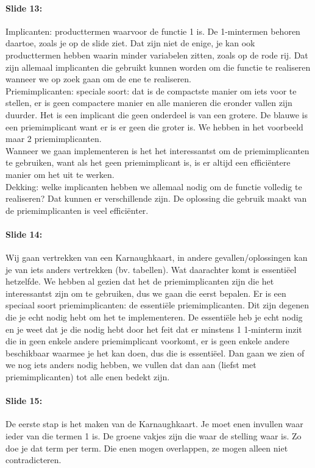 \documentclass[10pt,a4paper]{book}
\begin{document}
\paragraph{Slide 13:} Implicanten: producttermen waarvoor de functie 1 is. De 1-mintermen behoren daartoe, zoals je op de slide ziet. Dat zijn niet de enige, je kan ook producttermen hebben waarin minder variabelen zitten, zoals op de rode rij. Dat zijn allemaal implicanten die gebruikt kunnen worden om die functie te realiseren wanneer we op zoek gaan om de ene te realiseren.\\
Priemimplicanten: speciale soort: dat is de compactste manier om iets voor te stellen, er is geen compactere manier en alle manieren die eronder vallen zijn duurder. Het is een implicant die geen onderdeel is van een grotere. De blauwe is een priemimplicant want er is er geen die groter is. We hebben in het voorbeeld maar 2 priemimplicanten. \\
Wanneer we gaan implementeren is het het interessantst om de priemimplicanten te gebruiken, want als het geen priemimplicant is, is er altijd een effici\"entere manier om het uit te werken.\\
Dekking: welke implicanten hebben we allemaal nodig om de functie volledig te realiseren? Dat kunnen er verschillende zijn. De oplossing die gebruik maakt van de priemimplicanten is veel effici\"enter.

\paragraph{Slide 14:} Wij gaan vertrekken van een Karnaughkaart, in andere gevallen/oplossingen kan je van iets anders vertrekken (bv. tabellen). Wat daarachter komt is essenti\"eel hetzelfde. We hebben al gezien dat het de priemimplicanten zijn die het interessantst zijn om te gebruiken, dus we gaan die eerst bepalen. Er is een speciaal soort priemimplicanten: de essenti\"ele priemimplicanten. Dit zijn degenen die je echt nodig hebt om het te implementeren. De essenti\"ele heb je echt nodig en je weet dat je die nodig hebt door het feit dat er minstens 1 1-minterm inzit die in geen enkele andere priemimplicant voorkomt, er is geen enkele andere beschikbaar waarmee je het kan doen, dus die is essenti\"eel. Dan gaan we zien of we nog iets anders nodig hebben, we vullen dat dan aan (liefst met priemimplicanten) tot alle enen bedekt zijn.

\paragraph{Slide 15:} De eerste stap is het maken van de Karnaughkaart. Je moet enen invullen waar ieder van die termen 1 is. De groene vakjes zijn die waar de stelling waar is. Zo doe je dat term per term. Die enen mogen overlappen, ze mogen alleen niet contradicteren.
\end{document}
